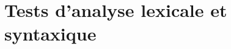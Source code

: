 \documentclass[a4paper,12pt]{article}
\begin{document}
\section{Tests d'analyse lexicale et syntaxique}






\end{document}
